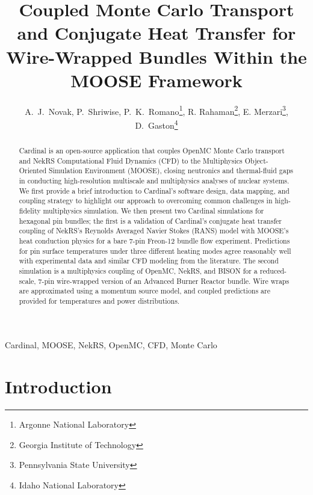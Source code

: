 \documentclass[3p,,preprint,11pt]{elsarticle}
\begin{document}
\begin{frontmatter}

\title{Coupled Monte Carlo Transport and Conjugate Heat Transfer for Wire-Wrapped Bundles Within the MOOSE Framework}

\author{A.~J.~Novak, P.~Shriwise, P.~K.~Romano\footnote{Argonne National Laboratory}, R. Rahaman\footnote{Georgia Institute of Technology}, E. Merzari\footnote{Pennsylvania State University}, D.~Gaston\footnote{Idaho National Laboratory}}

\begin{abstract}
Cardinal is an open-source application that couples OpenMC Monte Carlo transport and NekRS Computational Fluid Dynamics (CFD) to the Multiphysics Object-Oriented Simulation Environment (MOOSE), closing neutronics and thermal-fluid gaps in conducting high-resolution multiscale and multiphysics analyses of nuclear systems.
We first provide a brief introduction to Cardinal’s software design, data mapping, and coupling strategy to highlight our approach to overcoming common challenges in high-fidelity multiphysics simulation. We then present two Cardinal simulations for hexagonal pin bundles; the first is a validation of Cardinal's conjugate heat transfer coupling of NekRS's Reynolds Averaged Navier Stokes (RANS) model with MOOSE's heat conduction physics for a bare 7-pin Freon-12 bundle flow experiment. Predictions for pin surface temperatures under three different heating modes agree reasonably well with experimental data and similar CFD modeling from the literature. The second simulation is a multiphysics coupling of OpenMC, NekRS, and BISON for a reduced-scale, 7-pin wire-wrapped version of an Advanced Burner Reactor bundle. Wire wraps are approximated using a momentum source model, and coupled predictions are provided for temperatures and power distributions. %
\end{abstract}

\begin{keyword}
Cardinal, MOOSE, NekRS, OpenMC, CFD, Monte Carlo
\end{keyword}

\end{frontmatter}

\section{Introduction}
\end{document}
